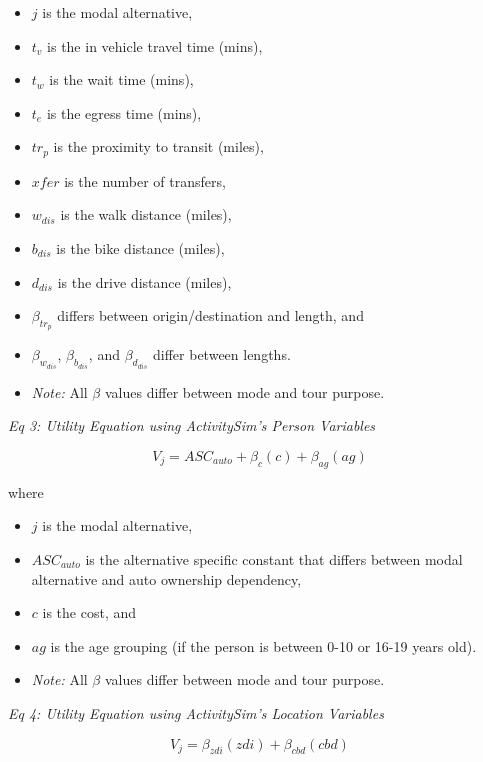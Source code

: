 \documentclass[3p, authoryear]{elsarticle} %
\providecommand{\tightlist}{%
  \setlength{\itemsep}{0pt}\setlength{\parskip}{0pt}}
\begin{document}
\begin{itemize}
\tightlist
\item
  \(j\) is the modal alternative,
\item
  \(t_v\) is the in vehicle travel time (mins),
\item
  \(t_w\) is the wait time (mins),
\item
  \(t_e\) is the egress time (mins),
\item
  \(tr_p\) is the proximity to transit (miles),
\item
  \(xfer\) is the number of transfers,
\item
  \(w_{dis}\) is the walk distance (miles),
\item
  \(b_{dis}\) is the bike distance (miles),
\item
  \(d_{dis}\) is the drive distance (miles),
\item
  \(\beta_{tr_p}\) differs between origin/destination and length, and
\item
  \(\beta_{w_{dis}}\), \(\beta_{b_{dis}}\), and \(\beta_{d_{dis}}\) differ between lengths.
\item
  \emph{Note:} All \(\beta\) values differ between mode and tour purpose.
\end{itemize}

\emph{Eq 3: Utility Equation using ActivitySim's Person Variables}

\begin{equation}
  V_j = ASC_{auto} +  \beta_{c}(c) + \beta_{ag}(ag) \label{eq:label3}
\end{equation}

where

\begin{itemize}
\tightlist
\item
  \(j\) is the modal alternative,
\item
  \(ASC_{auto}\) is the alternative specific constant that differs between modal alternative and auto ownership dependency,
\item
  \(c\) is the cost, and
\item
  \(ag\) is the age grouping (if the person is between 0-10 or 16-19 years old).
\item
  \emph{Note:} All \(\beta\) values differ between mode and tour purpose.
\end{itemize}

\emph{Eq 4: Utility Equation using ActivitySim's Location Variables}

\begin{equation}
  V_j = \beta_{zdi}(zdi) + \beta_{cbd}(cbd) \label{eq:label4}
\end{equation}
\end{document}

